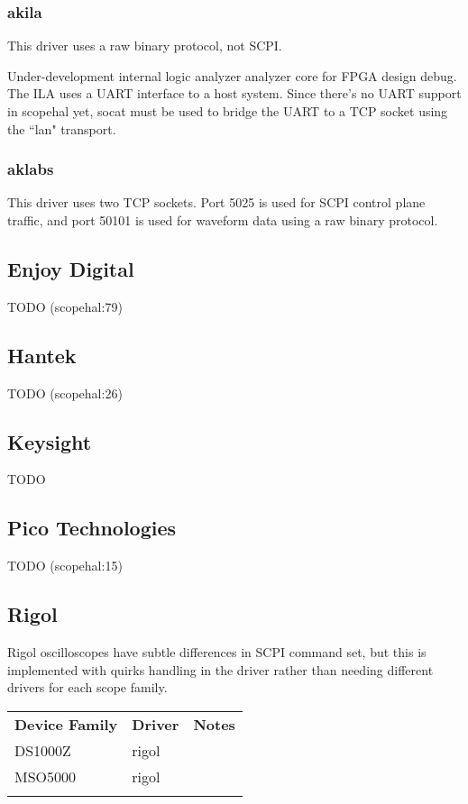 \subsubsection{akila}

This driver uses a raw binary protocol, not SCPI.

Under-development internal logic analyzer analyzer core for FPGA design debug. The ILA uses a UART interface to a host
system. Since there's no UART support in scopehal yet, socat must be used to bridge the UART to a TCP socket using
the ``lan" transport.

\subsubsection{aklabs}

This driver uses two TCP sockets. Port 5025 is used for SCPI control plane traffic, and port 50101 is used for waveform
data using a raw binary protocol.

\subsection{Enjoy Digital}
TODO (scopehal:79)

\subsection{Hantek}
TODO (scopehal:26)

\subsection{Keysight}
TODO

\subsection{Pico Technologies}
TODO (scopehal:15)

\subsection{Rigol}

Rigol oscilloscopes have subtle differences in SCPI command set, but this is implemented with quirks handling in the
driver rather than needing different drivers for each scope family.

\begin{tabularx}{16cm}{llX}
\thickhline
\textbf{Device Family} & \textbf{Driver} & \textbf{Notes} \\
\thickhline
DS1000Z & rigol & \\
\thickhline
MSO5000 & rigol & \\
\thickhline
\end{tabularx}


